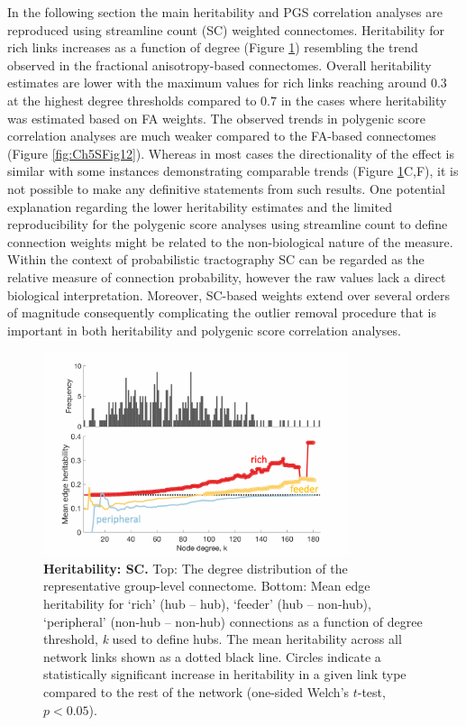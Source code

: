 \clearpage
In the following section the main heritability and PGS correlation analyses are reproduced using streamline count (SC) weighted connectomes. Heritability for rich links increases as a function of degree (Figure \ref{fig:Ch5SFig11}) resembling the trend observed in the fractional anisotropy-based connectomes. Overall heritability estimates are lower with the maximum values for rich links reaching around $0.3$ at the highest degree thresholds compared to $0.7$ in the cases where heritability was estimated based on FA weights. The observed trends in polygenic score correlation analyses are much weaker compared to the FA-based connectomes (Figure \ref{fig:Ch5SFig12}). Whereas in most cases the directionality of the effect is similar with some instances demonstrating comparable trends (Figure \ref{fig:Ch5SFig11}C,F), it is not possible to make any definitive statements from such results. One potential explanation regarding the lower heritability estimates and the limited reproducibility for the polygenic score analyses using streamline count to define connection weights might be related to the non-biological nature of the measure. Within the context of probabilistic tractography SC can be regarded as the relative measure of connection probability, however the raw values lack a direct biological interpretation. Moreover, SC-based weights extend over several orders of magnitude consequently complicating the outlier removal procedure that is important in both heritability and polygenic score correlation analyses.

\begin{figure}[h!]
\begin{center}
\includegraphics[width=0.8\textwidth]{Chapter5/SFigure11.pdf}%
\end{center}
\caption{\textbf{Heritability: SC.}
Top: The degree distribution of the representative group-level connectome. Bottom: Mean edge heritability for `rich' (hub -- hub), `feeder' (hub -- non-hub), `peripheral' (non-hub -- non-hub) connections as a function of degree threshold, \textit{k} used to define hubs. The mean heritability across all network links shown as a dotted black line. Circles indicate a statistically significant increase in heritability in a given link type compared to the rest of the network (one-sided Welch's $t$-test, $p < 0.05$). }
\label{fig:Ch5SFig11}
\end{figure}

